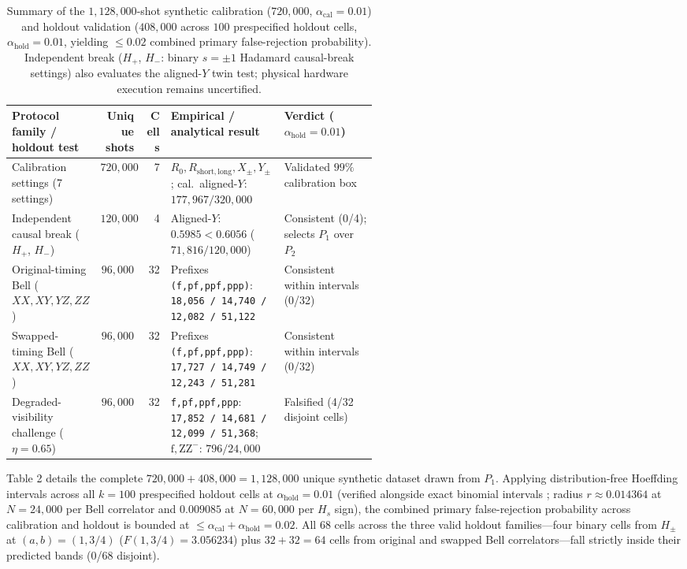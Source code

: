 \documentclass[11pt,letterpaper]{article}
\theoremstyle{definition}
\begin{document}
\begin{table}[tbp]
\centering
\small
\caption{Summary of the \(1{,}128{,}000\)-shot synthetic calibration
(\(720{,}000\), \(\alpha_{\mathrm{cal}}=0.01\)) and holdout validation
(\(408{,}000\) across \(100\) prespecified holdout cells,
\(\alpha_{\mathrm{hold}}=0.01\), yielding \(\le 0.02\) combined primary
false-rejection probability). Independent break (\(H_+\), \(H_-\):
binary \(s = \pm 1\) Hadamard causal-break settings) also evaluates the
aligned-\(Y\) twin test; physical hardware execution remains
uncertified.}\label{tab:benchmark}
\begin{tabularx}{\linewidth}{@{}>{\raggedright\arraybackslash}p{0.23\linewidth} r r >{\raggedright\arraybackslash}p{0.31\linewidth} >{\raggedright\arraybackslash}X@{}}
\toprule
Protocol family / holdout test & Unique shots & Cells & Empirical / analytical result & Verdict (\(\alpha_{\mathrm{hold}} = 0.01\)) \\
\midrule
Calibration settings (7 settings) & \(720{,}000\) & 7 & \(R_0, R_{\mathrm{short,long}}, X_\pm, Y_\pm\); cal.~aligned-\(Y\):
\(177{,}967/320{,}000\) & Validated \(99\%\) calibration box \\
Independent causal break (\(H_+\), \(H_-\)) & \(120{,}000\) & 4 & Aligned-\(Y\): \(0.5985 < 0.6056\) (\(71{,}816/120{,}000\)) & Consistent (0/4); selects \(P_1\) over \(P_2\) \\
Original-timing Bell (\(XX, XY, YZ, ZZ\)) & \(96{,}000\) & 32 & Prefixes \texttt{(f,pf,ppf,ppp)}:
\texttt{18,056\ /\ 14,740\ /\ 12,082\ /\ 51,122} & Consistent within intervals (0/32) \\
Swapped-timing Bell (\(XX, XY, YZ, ZZ\)) & \(96{,}000\) & 32 & Prefixes \texttt{(f,pf,ppf,ppp)}:
\texttt{17,727\ /\ 14,749\ /\ 12,243\ /\ 51,281} & Consistent within intervals (0/32) \\
Degraded-visibility challenge (\(\eta = 0.65\)) & \(96{,}000\) & 32 & \texttt{f,pf,ppf,ppp}: \texttt{17,852\ /\ 14,681\ /\ 12,099\ /\ 51,368};
\(\mathrm{f,ZZ}^-\): \(796/24{,}000\) & Falsified (4/32 disjoint cells) \\
\bottomrule
\end{tabularx}
\end{table}

Table 2 details the complete \(720{,}000 + 408{,}000 = 1{,}128{,}000\)
unique synthetic dataset drawn from \(P_1\). Applying distribution-free
Hoeffding intervals \citep{hoeffding1963} across all \(k = 100\)
prespecified holdout cells at \(\alpha_{\mathrm{hold}} = 0.01\)
(verified alongside exact binomial intervals \citep{clopperPearson1934};
radius \(r \approx 0.014364\) at \(N = 24{,}000\) per Bell correlator
and \(0.009085\) at \(N = 60{,}000\) per \(H_s\) sign), the combined
primary false-rejection probability across calibration and holdout is
bounded at
\(\le \alpha_{\mathrm{cal}} + \alpha_{\mathrm{hold}} = 0.02\). All
\(68\) cells across the three valid holdout families---four binary cells
from \(H_\pm\) at \((a, b) = (1, 3/4)\) (\(F(1, 3/4) = 3.056234\)) plus
\(32 + 32 = 64\) cells from original and swapped Bell correlators---fall
strictly inside their predicted bands (0/68 disjoint).
\end{document}
